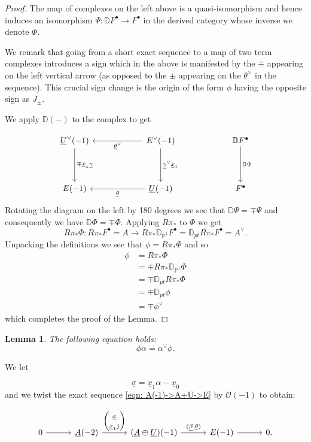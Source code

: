 \message{ !name(Bryan-Vakil.tex)}\documentclass{amsart}
\newtheorem{lemma}[theorem]{Lemma}
\theoremstyle{definition}
\newcommand{\DD} {{\mathbb D}}
\newcommand{\PP}{\mathbb{P}}
\newcommand{\OO}{\mathcal{O}}
\newcommand{\UL}[1]{\underline{#1}}
\newcommand{\Rpistar}{R\pi_{*}}
\begin{document}
\begin{proof}
The map of complexes on the left above is a quasi-isomorphism and
hence induces an isomorphism $\Psi :\DD F^{\bullet}\to F^{\bullet}$
in the derived category whose inverse we denote $\Phi$.

We remark that going from a short exact sequence to a map of two term
complexes introduces a sign which in the above is manifested by the
$\mp$ appearing on the left vertical arrow (as opposed to the $\pm$
appearing on the $\UL{\theta}^{\vee}$ in the sequence). This crucial
sign change is the origin of the form $\phi$ having the opposite sign
as $J_{\pm}$.

We apply $\DD (-)$ to the complex to get

\[
\begin{tikzcd}[column sep=6em,row sep=4em]
  \UL{U}^{\vee }(-1)
    \arrow[d,"\mp\UL{x}_{1} \UL{\gamma}"]
  & E^{\vee}(-1)
    \arrow[d,"\UL{\gamma }^{\vee } \UL{x}_{1}"]
    \arrow[l,"\UL{\theta }^{\vee}"]
  & \DD F^{\bullet}
    \arrow[d,"\DD \Psi  "]
  \\
  E(-1)
  & \UL{U}(-1)
    \arrow[l,"\UL{\theta }"]
  & F^{\bullet}
\end{tikzcd}
\]
Rotating the diagram on the left by 180 degrees we see that $\DD \Psi
=\mp \Psi$ and consequently we have $\DD \Phi =\mp \Phi$. Applying
$\Rpistar $ to $\Phi$ we get
\[
\Rpistar \Phi : \Rpistar F^{\bullet} = A \to \Rpistar
\DD_{\PP^{1}}F^{\bullet}=\DD_{pt}\Rpistar F^{\bullet} = A^{\vee}.
\]
Unpacking the definitions we see that $\phi  = \Rpistar \Phi$ and so
\begin{align*}
\phi &=\Rpistar \Phi \\
&=\mp \Rpistar \DD_{\PP^{1}}\Phi \\
&=\mp \DD_{pt}\Rpistar \Phi \\
&=\mp \DD_{pt}\phi \\
&=\mp \phi^{\vee}
\end{align*}
which completes the proof of the Lemma.
\end{proof}
 
  
\begin{lemma}\label{lem: phi.alpha=alphavee.phi} The following
equation holds:
\[
\phi \alpha =\alpha^{\vee}\phi .
\]
\end{lemma}

\proof We let

\[
\UL{\sigma} = \UL{x}_{1}\alpha -\UL{x}_{0}
\]
and we twist the exact sequence \eqref{eqn: A(-1)->A+U->E} by $\OO
(-1)$ to obtain:

\[
\begin{tikzcd}[column sep=3em]
  0
    \arrow[r]
  & \UL{A}(-2)
    \arrow[r,"{%
      \begin{pmatrix}
        \UL{\sigma } \\
        \UL{x}_{1}j
      \end{pmatrix}
    }"]
  & (\UL{A}\oplus \UL{U})(-1)
    \arrow[r,"{(\UL{\beta},\UL{\theta})}"]
  & E(-1)
    \arrow[r]
  & 0.
\end{tikzcd}
\]
\end{document}
